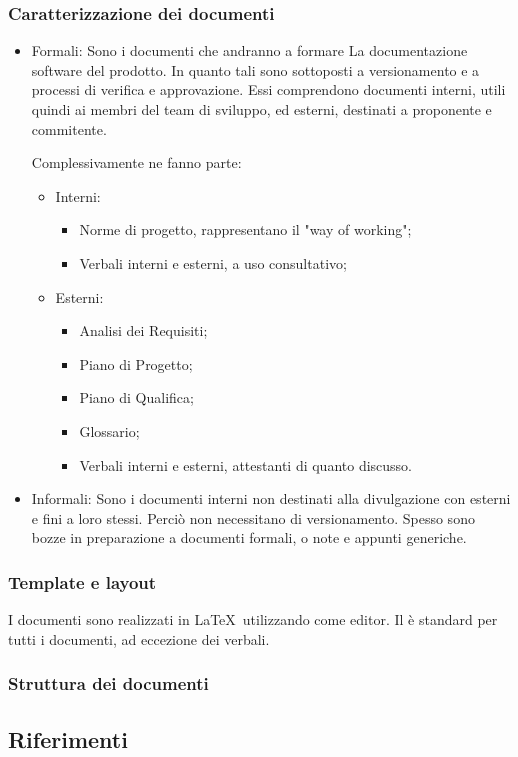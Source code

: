 \subsubsection{Caratterizzazione dei documenti}
\begin{itemize}
    \item Formali:
    Sono i documenti che andranno a formare La documentazione software del prodotto. In quanto tali sono sottoposti a versionamento e a processi di verifica e approvazione.
    Essi comprendono documenti interni, utili quindi ai membri del team di sviluppo, ed esterni, destinati a proponente e commitente.

    Complessivamente ne fanno parte:
    \begin{itemize}
        \item Interni: 
        \begin{itemize}
            \item Norme di progetto, rappresentano il "way of working";
            \item Verbali interni e esterni, a uso consultativo;
        \end{itemize}
        \item Esterni:
         \begin{itemize}
            \item Analisi dei Requisiti;
            \item Piano di Progetto; 
            \item Piano di Qualifica; 
            \item Glossario; 
            \item Verbali interni e esterni, attestanti di quanto discusso.
        \end{itemize}
    \end{itemize}
    \item Informali:
    Sono i documenti interni non destinati alla divulgazione con esterni e fini a loro stessi. Perciò non necessitano di versionamento.
    Spesso sono bozze in preparazione a documenti formali, o note e appunti generiche.
\end{itemize}
\subsubsection{Template e layout}
I documenti sono realizzati in \LaTeX\ utilizzando come editor. Il è standard per tutti i documenti, ad eccezione dei verbali.

\subsubsection{Struttura dei documenti}




\subsection{Riferimenti}
